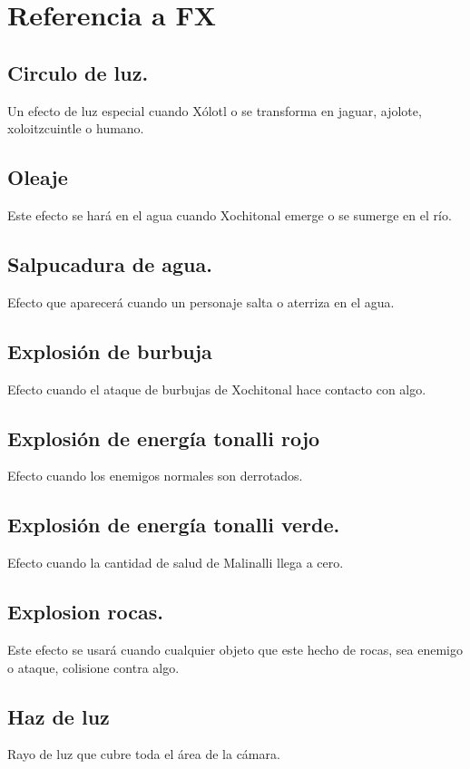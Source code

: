 \chapter{Referencia a FX}
\section{Circulo de luz.} \label{FX:CirLuz}
Un efecto de luz especial cuando Xólotl o se transforma en jaguar, ajolote, xoloitzcuintle o humano.
\section{Oleaje}\label{FX:Oleaje}
Este efecto se hará en el agua cuando Xochitonal emerge o se sumerge en el río.
\section{Salpucadura de agua.} \label{FX:SalAgua}
Efecto que aparecerá cuando un personaje salta o aterriza en el agua.
\section{Explosión de burbuja}\label{FX:ExpAgua}
Efecto cuando el ataque de burbujas de Xochitonal hace contacto con algo.
\section{Explosión de energía tonalli rojo} \label{FX:ExpTonR}
Efecto cuando los enemigos normales son derrotados.
\section{Explosión de energía tonalli verde.} \label{FX:ExpTonV}
 Efecto cuando la cantidad de salud de Malinalli llega a cero.
\section{Explosion rocas.} \label{FX:ExpRoc}
Este efecto se usará cuando cualquier objeto que este hecho de rocas, sea enemigo o ataque, colisione contra algo.
\section{Haz de luz} \label{FX:HazLuz}
Rayo de luz que cubre toda el área de la cámara. 
